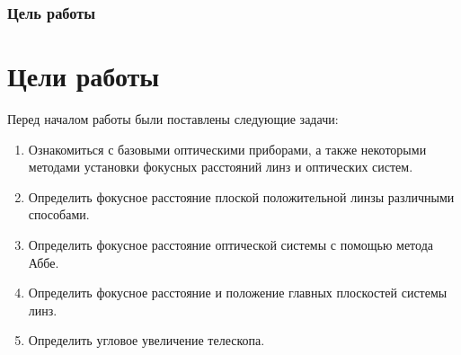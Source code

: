 \documentclass[10pt,pdf,hyperref={unicode}]{beamer}
\begin{document}
	\begin{frame}
\frametitle{Цель работы} 
\section{Цели работы}

Перед началом работы были поставлены следующие задачи:

\begin{enumerate}
	
	\item Ознакомиться с базовыми оптическими приборами, а также некоторыми методами установки фокусных расстояний линз и оптических систем. 
	
	\item Определить фокусное расстояние плоской положительной линзы различными способами.
	
	\item Определить фокусное расстояние оптической системы с помощью метода Аббе.
	
	\item Определить фокусное расстояние и положение главных плоскостей системы линз.
	
	\item Определить угловое увеличение телескопа.
\end{enumerate}
\end{frame}
\end{document}
